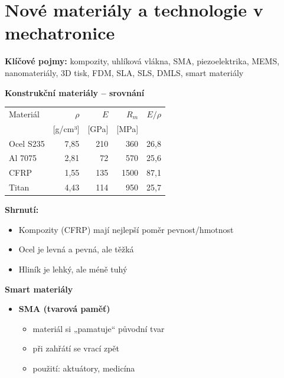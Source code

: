 \documentclass[a4paper,10pt]{article}
\begin{document}
\section{Nové materiály a technologie v mechatronice}

\begin{pojmybox}
\textbf{Klíčové pojmy:}
kompozity, uhlíková vlákna, SMA, piezoelektrika,
MEMS, nanomateriály, 3D tisk,
FDM, SLA, SLS, DMLS, smart materiály
\end{pojmybox}

\begin{vysvetlenibox}

\textbf{Konstrukční materiály -- srovnání}

\begin{center}
\begin{tabular}{l r r r r}
Materiál & $\rho$ & $E$ & $R_m$ & $E/\rho$ \\
 & [g/cm³] & [GPa] & [MPa] & \\
\hline
Ocel S235 & 7,85 & 210 & 360 & 26,8 \\
Al 7075   & 2,81 & 72  & 570 & 25,6 \\
CFRP      & 1,55 & 135 & 1500 & 87,1 \\
Titan     & 4,43 & 114 & 950 & 25,7 \\
\end{tabular}
\end{center}

\textbf{Shrnutí:}
\begin{itemize}
\item Kompozity (CFRP) mají nejlepší poměr pevnost/hmotnost
\item Ocel je levná a pevná, ale těžká
\item Hliník je lehký, ale méně tuhý
\end{itemize}

\textbf{Smart materiály}

\begin{itemize}
\item \textbf{SMA (tvarová paměť)}
    \begin{itemize}
    \item materiál si „pamatuje“ původní tvar
    \item při zahřátí se vrací zpět
    \item použití: aktuátory, medicína
    \end{itemize}


\end{itemize}
\end{vysvetlenibox}
\end{document}
